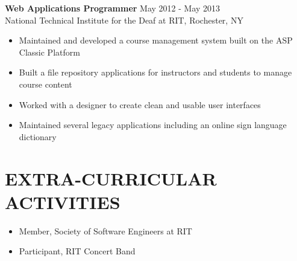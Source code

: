 \documentclass[line,margin]{res}
\begin{document}
\begin{resume}
			   {\bf Web Applications Programmer} \hfill May 2012 - May 2013\\
               National Technical Institute for the Deaf at RIT, 
               Rochester, NY
               
                 \begin{itemize}  \itemsep -2pt %
				  \item Maintained and developed a course management system built on the ASP Classic Platform
                  \item Built a file repository applications for instructors and students to manage course content
                  \item Worked with a designer to create clean and usable user interfaces
                  \item Maintained several legacy applications including an online sign language dictionary
                \end{itemize}
 

   
 
				 \section{EXTRA-CURRICULAR \\ ACTIVITIES}             
				     \begin{itemize}  \itemsep -2pt 
					 	    \item Member, Society of Software Engineers at RIT
               	\item Participant, RIT Concert Band 
				 	\end{itemize} 
\end{resume}
\end{document}
